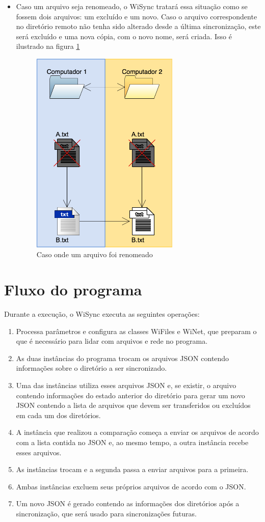 \documentclass[12pt,a4paper]{ufpr}
\begin{document}
\begin{itemize}
  \item Caso um arquivo seja renomeado, o WiSync tratará essa situação como se fossem dois arquivos: um excluído e um novo. Caso o arquivo correspondente no diretório remoto não tenha sido alterado desde a última sincronização, este será excluído e uma nova cópia, com o novo nome, será criada. Isso é ilustrado na figura \ref{d}
  \begin{figure}[h]
    \centering
    \includegraphics[width=200pt]{img/d.png}
    \caption{Caso onde um arquivo foi renomeado}
    \label{d}
  \end{figure}
\end{itemize}

\section{Fluxo do programa}
Durante a execução, o WiSync executa as seguintes operações:
\begin{enumerate}
  \item Processa parâmetros e configura as classes WiFiles e WiNet, que preparam o que é necessário para lidar com arquivos e rede no programa.
    \item As duas instâncias do programa trocam os arquivos JSON contendo informações sobre o diretório a ser sincronizado.
    \item Uma das instâncias utiliza esses arquivos JSON e, se existir, o arquivo contendo informações do estado anterior do diretório para gerar um novo JSON contendo a lista de arquivos que devem ser transferidos ou excluídos em cada um dos diretórios.
    \item A instância que realizou a comparação começa a enviar os arquivos de acordo com a lista contida no JSON e, ao mesmo tempo, a outra instância recebe esses arquivos.
    \item As instâncias trocam e a segunda passa a enviar arquivos para a primeira.
    \item Ambas instâncias excluem seus próprios arquivos de acordo com o JSON.
    \item Um novo JSON é gerado contendo as informações dos diretórios após a sincronização, que será usado para sincronizações futuras.
\end{enumerate}
\end{document}
